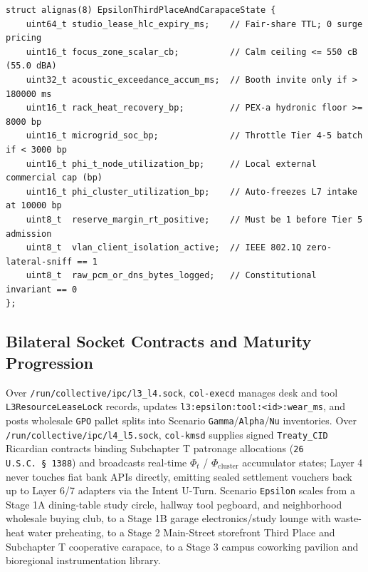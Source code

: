 \begin{lstlisting}[caption={Scenario \texttt{Epsilon} Acoustic Envelope, Compute Hydronics, and Tier 5 Carapace Curtailment Frame},label={lst:epsilon-structs}]
struct alignas(8) EpsilonThirdPlaceAndCarapaceState {
    uint64_t studio_lease_hlc_expiry_ms;    // Fair-share TTL; 0 surge pricing
    uint16_t focus_zone_scalar_cb;          // Calm ceiling <= 550 cB (55.0 dBA)
    uint32_t acoustic_exceedance_accum_ms;  // Booth invite only if > 180000 ms
    uint16_t rack_heat_recovery_bp;         // PEX-a hydronic floor >= 8000 bp
    uint16_t microgrid_soc_bp;              // Throttle Tier 4-5 batch if < 3000 bp
    uint16_t phi_t_node_utilization_bp;     // Local external commercial cap (bp)
    uint16_t phi_cluster_utilization_bp;    // Auto-freezes L7 intake at 10000 bp
    uint8_t  reserve_margin_rt_positive;    // Must be 1 before Tier 5 admission
    uint8_t  vlan_client_isolation_active;  // IEEE 802.1Q zero-lateral-sniff == 1
    uint8_t  raw_pcm_or_dns_bytes_logged;   // Constitutional invariant == 0
};
\end{lstlisting}

\subsection{Bilateral Socket Contracts and Maturity Progression}

Over \texttt{/run/collective/ipc/l3\_l4.sock}, \texttt{col-execd} manages desk and tool
\texttt{L3ResourceLeaseLock} records, updates \texttt{l3:epsilon:tool:<id>:wear\_ms}, and posts wholesale
\texttt{GPO} pallet splits into Scenario \texttt{Gamma}/\texttt{Alpha}/\texttt{Nu} inventories. Over
\texttt{/run/collective/ipc/l4\_l5.sock}, \texttt{col-kmsd} supplies signed \texttt{Treaty\_CID} Ricardian
contracts \parencite{grigg2004} binding Subchapter T patronage allocations (\texttt{26 U.S.C.\ \S~1388})
and broadcasts real-time $\Phi_t$ / $\Phi_{\mathrm{cluster}}$ accumulator states; Layer 4 never touches
fiat bank APIs directly, emitting sealed settlement vouchers back up to Layer 6/7 adapters via the Intent
U-Turn. Scenario \texttt{Epsilon} scales from a Stage 1A dining-table study circle, hallway tool pegboard,
and neighborhood wholesale buying club, to a Stage 1B garage electronics/study lounge with waste-heat
water preheating, to a Stage 2 Main-Street storefront Third Place and Subchapter T cooperative carapace,
to a Stage 3 campus coworking pavilion and bioregional instrumentation library.

